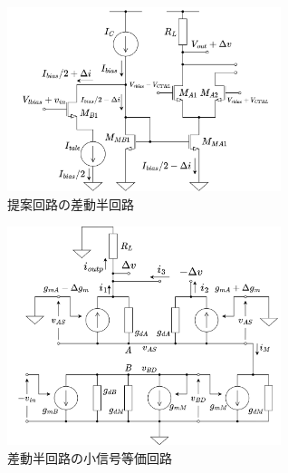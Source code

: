 \documentclass[twocolumn]{jsarticle}
\begin{document}
    \begin{figure}[H]
        \begin{center}
            \includegraphics*[width = 80mm]{figures/NtoNHalfDiff.png}
            \caption{提案回路の差動半回路}
            \label{fig:NtoN_half}
        \end{center}
    \end{figure}
    \begin{figure}[H]
        \begin{center}
            \includegraphics*[width = 80mm]{figures/NtoNHalfDiffEqual.png}
            \caption{差動半回路の小信号等価回路}
            \label{fig:NtoN_half_equal}
        \end{center}        
    \end{figure}
    \clearpage
\end{document}
